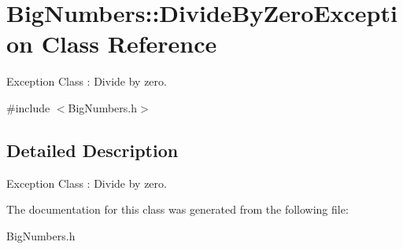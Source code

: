 \hypertarget{classBigNumbers_1_1DivideByZeroException}{}\section{Big\+Numbers\+:\+:Divide\+By\+Zero\+Exception Class Reference}
\label{classBigNumbers_1_1DivideByZeroException}


Exception Class \+: Divide by zero.  




{\ttfamily \#include $<$Big\+Numbers.\+h$>$}



\subsection{Detailed Description}
Exception Class \+: Divide by zero. 

The documentation for this class was generated from the following file\+:\begin{DoxyCompactItemize}
\item 
Big\+Numbers.\+h\end{DoxyCompactItemize}
